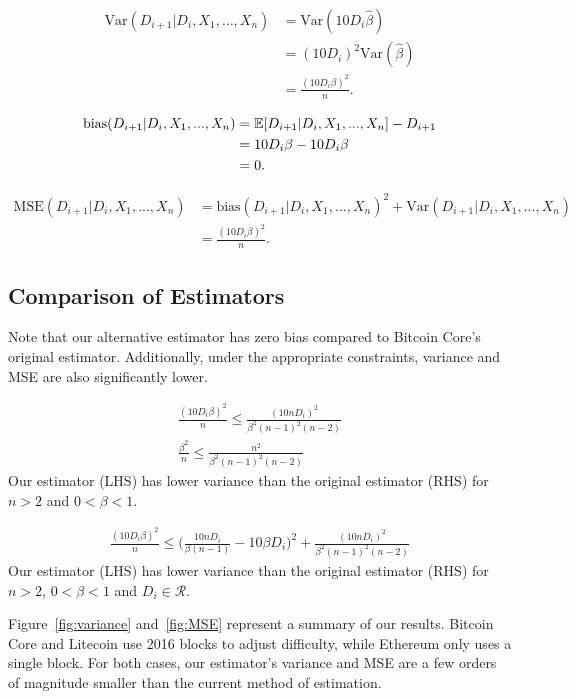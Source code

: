 \begin{align}
\text{Var}(D_{i+1} | D_{i}, X_1, \dots, X_{n}) &= \text{Var}(10 D_i \hat{\beta}) \\
&= (10 D_i)^2 \text{Var}(\hat{\beta}) \\
&= \frac{(10 D_i\beta)^2}{n}.
\end{align}

\begin{align}
\text{bias}(D_{i+1}|D_i,X_1,...,X_n) &= \operatorname{\mathbb{E}}[D_{i+1}|D_i,X_1,...,X_n] - D_{i+1} \\
&= 10 D_i\beta - 10 D_i\beta \\
&= 0.
\end{align}

\begin{align}
\text{MSE}(D_{i+1}|D_i,X_1,...,X_n) &= \text{bias}(D_{i+1}|D_i,X_1,...,X_n)^2 + \text{Var}(D_{i+1}|D_i,X_1,...,X_n) \\
&= \frac{(10 D_i\beta)^2}{n}.
\end{align}

\subsection{Comparison of Estimators}
Note that our alternative estimator has zero bias compared to Bitcoin Core's original estimator. Additionally, under the appropriate constraints, variance and MSE are also significantly lower.
\par \noindent {}
\begin{align}
\frac{(10 D_i\beta)^2}{n} \leq \frac{(10n D_i)^2}{\beta^2(n-1)^2(n-2)} \\
\frac{\beta^2}{n} \leq \frac{n^2}{\beta^2(n-1)^2(n-2)} 
\end{align}
Our estimator (LHS) has lower variance than the original estimator (RHS) for $n>2$ and $0<\beta<1$.

\begin{align}
\frac{(10 D_i\beta)^2}{n} \leq \Bigg(\frac{10n D_i}{\beta(n-1)} - 10\beta D_i\Bigg)^2 + \frac{(10n D_i)^2}{\beta^2(n-1)^2(n-2)}
\end{align}
Our estimator (LHS) has lower variance than the original estimator (RHS) for $n>2$, $0<\beta<1$ and $D_i \in \mathcal{R}$. 

Figure~\ref{fig:variance} and~\ref{fig:MSE} represent a summary of our results. Bitcoin Core and Litecoin use 2016 blocks to adjust difficulty, while Ethereum only uses a single block. For both cases, our estimator's variance and MSE are a few orders of magnitude smaller than the current method of estimation.

